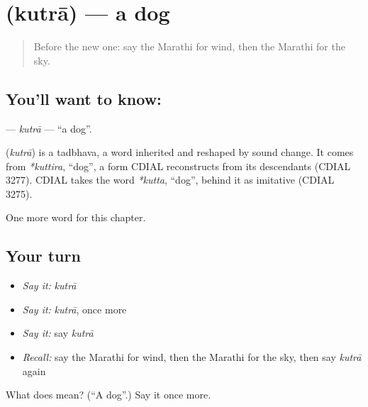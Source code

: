 \section[\texorpdfstring{\mr{कुत्रा} (kutrā)}{कुत्रा (kutrā)}]{ (kutrā) — a dog}

\label{lesson:MR-C99-kutra}



\begin{quote}
Before the new one: say the Marathi for wind, then the Marathi for the sky.
\end{quote}

\subsection*{You'll want to know: }
\textbf{} — \emph{kutrā} — \textquotedblleft{}a dog\textquotedblright{}.

\begin{cousinweb}
\textbf{} (\emph{kutrā}) is a tadbhava, a word inherited and reshaped by sound change. It comes from \emph{*kuttira}, \textquotedblleft{}dog\textquotedblright{}, a form CDIAL reconstructs from its descendants (CDIAL 3277). CDIAL takes the word \emph{*kutta}, \textquotedblleft{}dog\textquotedblright{}, behind it as imitative (CDIAL 3275).
\end{cousinweb}

\begin{grammarlens}[title={What you've built}]
One more word for this chapter.
\end{grammarlens}

\subsection*{Your turn}
\begin{itemize}
\raggedright
  \item \emph{Say it:} \emph{kutrā}
  \item \emph{Say it:} \emph{kutrā}, once more
  \item \emph{Say it:} say \emph{kutrā}
  \item \emph{Recall:} say the Marathi for wind, then the Marathi for the sky, then say \emph{kutrā} again
\end{itemize}

\begin{tcolorbox}[breakable,colback=teal!4,colframe=teal!35!black,title={Before you move on}]
What does  mean? (\textquotedblleft{}A dog\textquotedblright{}.) Say it once more.
\end{tcolorbox}
